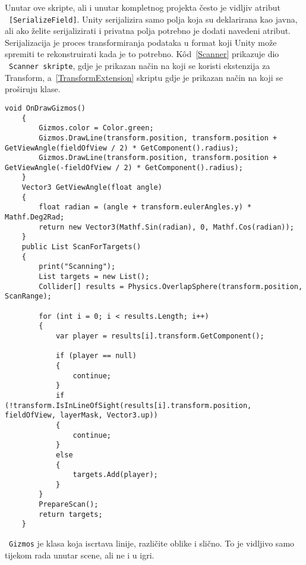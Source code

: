 Unutar ove skripte, ali i unutar kompletnog projekta često je vidljiv atribut
~\texttt{[SerializeField]}. Unity serijalizira samo polja koja su deklarirana kao javna, ali
ako želite serijalizirati i privatna polja potrebno je dodati navedeni atribut.
Serijalizacija je proces transformiranja podataka u format koji Unity može spremiti
te rekonstruirati kada je to potrebno.
K\^od~\ref{Scanner} prikazuje dio ~\texttt{Scanner skripte}, gdje je prikazan način na koji se
koristi ekstenzija za Transform, a~\ref{TransformExtension} skriptu gdje je prikazan
način na koji se proširuju klase.
\begin{lstlisting}[caption={Pretraživanje područja}, label=Scanner]
void OnDrawGizmos()
    {
        Gizmos.color = Color.green;
        Gizmos.DrawLine(transform.position, transform.position +
GetViewAngle(fieldOfView / 2) * GetComponent().radius);
        Gizmos.DrawLine(transform.position, transform.position +
GetViewAngle(-fieldOfView / 2) * GetComponent().radius);
    }
    Vector3 GetViewAngle(float angle)
    {
        float radian = (angle + transform.eulerAngles.y) * Mathf.Deg2Rad;
        return new Vector3(Mathf.Sin(radian), 0, Mathf.Cos(radian));
    }
    public List ScanForTargets()
    {
        print("Scanning");
        List targets = new List();
        Collider[] results = Physics.OverlapSphere(transform.position, ScanRange);

        for (int i = 0; i < results.Length; i++)
        {
            var player = results[i].transform.GetComponent();

            if (player == null)
            {
                continue;
            }
            if (!transform.IsInLineOfSight(results[i].transform.position,
fieldOfView, layerMask, Vector3.up))
            {
                continue;
            }
            else
            {
                targets.Add(player);
            }
        }
        PrepareScan();
        return targets;
    }
\end{lstlisting}

~\texttt{Gizmos} je klasa koja iscrtava linije, različite oblike i slično. To je vidljivo samo
tijekom rada unutar scene, ali ne i u igri.

